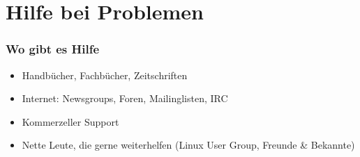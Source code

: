 \documentclass[]{beamer}
\begin{document}
\section{Hilfe bei Problemen}
\begin{frame}
	\frametitle{Wo gibt es Hilfe}
	\begin{itemize}
		\item Handbücher, Fachbücher, Zeitschriften
		\item Internet: Newsgroups, Foren, Mailinglisten, IRC
		\item Kommerzeller Support
		\item Nette Leute, die gerne weiterhelfen (Linux User Group, Freunde \& Bekannte)
	\end{itemize}
\end{frame}
\end{document}
